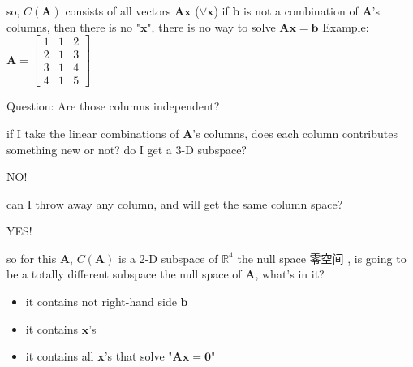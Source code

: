 \documentclass[12pt, a4paper]{article}
\begin{document}
{\vspace{14pt}
\newline
so, $C(\mathbf{A})$ consists of all vectors ${\mathbf{A}}{\mathbf{x}}$ ($\forall{\mathbf{x}}$)
\vspace{14pt}
\newline
if ${\mathbf{b}}$ is not a combination of ${\mathbf{A}}$'s columns, then there is no "${\mathbf{x}}$", there is no way to solve ${\mathbf{A}}{\mathbf{x}} = {\mathbf{b}}$
\vspace{14pt}
\newline
Example: 
\begin{math}
	{\mathbf{A}} = 
	\begin{bmatrix}
		1 & 1 & 2 \\
		2 & 1 & 3 \\
		3 & 1 & 4 \\
		4 & 1 & 5
	\end{bmatrix}
\end{math}
\par 
Question: Are those columns independent?
\vspace{14pt}
\par 
if I take the linear combinations of ${\mathbf{A}}$'s columns, does each column contributes something new or not? do I get a 3-D subspace?
\par 
NO!
\vspace{14pt}
\par 
can I throw away any column, and will get the same column space?
\par 
YES!
\vspace{14pt}
\par 
so for this ${\mathbf{A}}$, $C(\mathbf{A})$ is a 2-D subspace of $\mathbb{R}^4$
\vspace{31pt}
\newline
the null space 零空间 , is going to be a totally different subspace
\vspace{14pt}
\newline
the null space of ${\mathbf{A}}$, what's in it?
\begin{itemize}
	\item it contains not right-hand side ${\mathbf{b}}$
	\item it contains ${\mathbf{x}}$'s
	\item it contains all ${\mathbf{x}}$'s that solve "${\mathbf{A}}{\mathbf{x}} = {\mathbf{0}}$"
\end{itemize}
\vspace{14pt}
\begin{math}

\end{math}}
\end{document}
